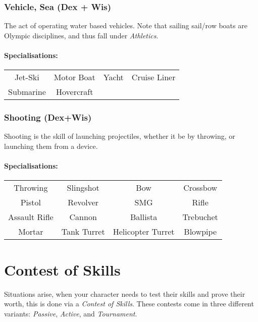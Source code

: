 \subsubsection{Vehicle, Sea (Dex + Wis)}
The act of operating water based vehicles.
Note that sailing sail/row boats are Olympic disciplines, and thus fall under \textit{Athletics}.

\paragraph{Specialisations:}
\begin{center}
    \begin{tabular}{c|c|c|c}
        Jet-Ski & Motor Boat & Yacht & Cruise Liner \\
        Submarine & Hovercraft & 
    \end{tabular}
\end{center}

\subsubsection{Shooting (Dex+Wis)}
Shooting is the skill of launching projectiles, whether it be by throwing, or launching them from a device.

\paragraph{Specialisations:}
\begin{center}
    \begin{tabular}{c|c|c|c}
        Throwing & Slingshot & Bow & Crossbow \\
        Pistol & Revolver & SMG & Rifle \\
        Assault Rifle & Cannon & Ballista & Trebuchet \\
        Mortar & Tank Turret & Helicopter Turret & Blowpipe
    \end{tabular}
\end{center}

\newpage
\section{Contest of Skills}\label{sec:contest}
Situations arise, when your character needs to test their skills and prove their worth, this is done via a \textit{Contest of Skills}.
These contests come in three different variants: \textit{Passive}, \textit{Active}, and \textit{Tournament}.

